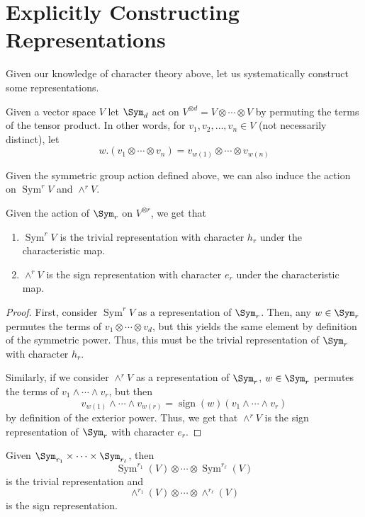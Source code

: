 \documentclass[11pt,leqno,oneside]{amsart}
\numberwithin{thm}{section}
\newcommand{\SymP}{\operatorname{Sym}}
\newcommand{\ExtP}{\wedge}
\newcommand{\sign}{\operatorname{sign}}
\begin{document}
\section{Explicitly Constructing Representations}
Given our knowledge of character theory above, let us systematically
construct some representations.
\begin{defn}
  Given a vector space \(V\) let \(\Sym_d\) act on \(V^{\otimes d} = V
  \otimes \cdots \otimes V\) by permuting the terms of the tensor
  product. In other words, for \(v_1, v_2, \ldots, v_n \in V\) (not
  necessarily distinct), let \[
    w.(v_1 \otimes \cdots \otimes v_n) = v_{w(1)} \otimes \cdots
    \otimes v_{w(n)}
  \]
\end{defn}
Given the symmetric group action defined above, we can also induce the
action on \(\SymP^r V\) and \(\ExtP^r V\).
\begin{prop}
  Given the action of \(\Sym_r\) on \(V^{\otimes r}\), we get that
  \begin{enumerate}
  \item \(\SymP^r V\) is the trivial representation with character
    \(h_r\) under the characteristic map.
  \item \(\ExtP^r V\) is the sign representation with character
    \(e_r\) under the characteristic map.
  \end{enumerate}
\end{prop}
\begin{proof}
   First, consider \(\SymP^{r} V\) as a representation of
  \(\Sym_r\). Then, any \(w \in \Sym_r\) permutes the terms of \(v_1
  \otimes \cdots \otimes v_d\), but this yields the same element by
  definition of the symmetric power. Thus, this must be the trivial
  representation of \(\Sym_r\) with character \(h_{r}\).

  Similarly, if we consider \(\ExtP^r V\) as a representation of
  \(\Sym_r\), \(w \in \Sym_r\) permutes the terms of \(v_1 \wedge
  \cdots \wedge v_r\), but then \[
    v_{w(1)} \wedge \cdots \wedge v_{w(r)} = \sign(w) (v_1 \wedge
    \cdots \wedge v_r)
  \]
  by definition of the exterior power. Thus, we get that \(\ExtP^r V\)
  is the sign representation of \(\Sym_r\) with character \(e_r\).
\end{proof}
\begin{cor}
  Given \(\Sym_{r_1} \times \cdots \times \Sym_{r_\ell}\),
  then \[
    \SymP^{r_1}(V) \otimes \cdots \otimes \SymP^{r_\ell}(V)
  \]
  is the trivial representation and \[
    \ExtP^{r_1}(V) \otimes \cdots \otimes \ExtP^{r_\ell}(V)
  \]
  is the sign representation.
\end{cor}
\end{document}
